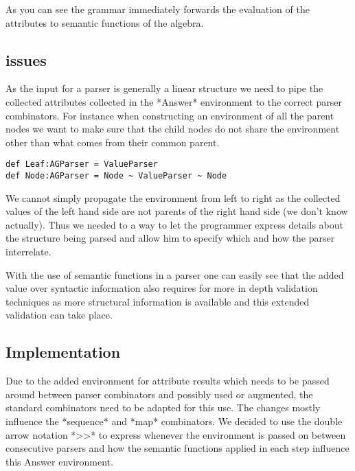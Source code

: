 As you can see the grammar immediately forwards the evaluation of the attributes to semantic functions of the algebra. 

\subsection{issues}
As the input for a parser is generally a linear structure we need to pipe the collected attributes collected in the *Answer* environment to the correct parser combinators. For instance when constructing an environment of all the parent nodes we want to make sure that the child nodes do not share the environment other than what comes from their common parent.

\begin{lstlisting}
def Leaf:AGParser = ValueParser
def Node:AGParser = Node ~ ValueParser ~ Node
\end{lstlisting}

We cannot simply propagate the environment from left to right as the collected values of the left hand side are not parents of the right hand side (we don't know actually). Thus we needed to a way to let the programmer express details about the structure being parsed and allow him to specify which and how the parser interrelate.

With the use of semantic functions in a parser one can easily see that the added value over syntactic information also requires for more in depth validation techniques as more structural information is available and this extended validation can take place.

\subsection{Implementation}
Due to the added environment for attribute results which needs to be passed around between parser combinators and possibly used or augmented, the standard combinators need to be adapted for this use. The changes mostly influence the *sequence* and *map* combinators.
We decided to use the double arrow notation *>>* to express whenever the environment is passed on between consecutive parsers and how the semantic functions applied in each step influence this Answer environment. 

